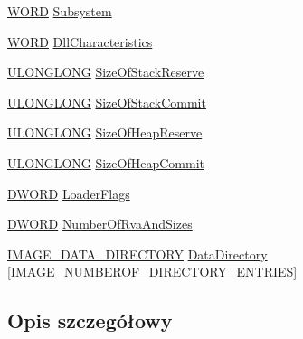 \begin{DoxyCompactItemize}
\item 
\hyperlink{winheader_8h_ab24077addd3b7b13e086987ff296552c}{W\-O\-R\-D} \hyperlink{struct___i_m_a_g_e___o_p_t_i_o_n_a_l___h_e_a_d_e_r64_afedeb8911d64e97bafd352f4c97e2557}{Subsystem}
\item 
\hyperlink{winheader_8h_ab24077addd3b7b13e086987ff296552c}{W\-O\-R\-D} \hyperlink{struct___i_m_a_g_e___o_p_t_i_o_n_a_l___h_e_a_d_e_r64_acb52816f699486ae920bb8537108e81d}{Dll\-Characteristics}
\item 
\hyperlink{winheader_8h_ae854efed5cfd3aad7d516ab4e2ce5748}{U\-L\-O\-N\-G\-L\-O\-N\-G} \hyperlink{struct___i_m_a_g_e___o_p_t_i_o_n_a_l___h_e_a_d_e_r64_a6a430bc6cc1ff57190ebccb15fcd6c70}{Size\-Of\-Stack\-Reserve}
\item 
\hyperlink{winheader_8h_ae854efed5cfd3aad7d516ab4e2ce5748}{U\-L\-O\-N\-G\-L\-O\-N\-G} \hyperlink{struct___i_m_a_g_e___o_p_t_i_o_n_a_l___h_e_a_d_e_r64_ac80afcdeb0fc60d456350dced4e43b8a}{Size\-Of\-Stack\-Commit}
\item 
\hyperlink{winheader_8h_ae854efed5cfd3aad7d516ab4e2ce5748}{U\-L\-O\-N\-G\-L\-O\-N\-G} \hyperlink{struct___i_m_a_g_e___o_p_t_i_o_n_a_l___h_e_a_d_e_r64_ad225b09c6adc28538ee637885a9b4589}{Size\-Of\-Heap\-Reserve}
\item 
\hyperlink{winheader_8h_ae854efed5cfd3aad7d516ab4e2ce5748}{U\-L\-O\-N\-G\-L\-O\-N\-G} \hyperlink{struct___i_m_a_g_e___o_p_t_i_o_n_a_l___h_e_a_d_e_r64_a6b958f37e1630fa76f26dc60f003e7d8}{Size\-Of\-Heap\-Commit}
\item 
\hyperlink{winheader_8h_af483253b2143078cede883fc3c111ad2}{D\-W\-O\-R\-D} \hyperlink{struct___i_m_a_g_e___o_p_t_i_o_n_a_l___h_e_a_d_e_r64_a731102c663ae88402d8aa08359c44ab5}{Loader\-Flags}
\item 
\hyperlink{winheader_8h_af483253b2143078cede883fc3c111ad2}{D\-W\-O\-R\-D} \hyperlink{struct___i_m_a_g_e___o_p_t_i_o_n_a_l___h_e_a_d_e_r64_a8f05696ef5a2588164d4e502519d30b4}{Number\-Of\-Rva\-And\-Sizes}
\item 
\hyperlink{winheader_8h_a0b3ef87140356b8cb58f4af9eed4d607}{I\-M\-A\-G\-E\-\_\-\-D\-A\-T\-A\-\_\-\-D\-I\-R\-E\-C\-T\-O\-R\-Y} \hyperlink{struct___i_m_a_g_e___o_p_t_i_o_n_a_l___h_e_a_d_e_r64_a1da47d1e624bf0180d0e1363480616ff}{Data\-Directory} \mbox{[}\hyperlink{winheader_8h_a75892b738729f0de64146086f462defe}{I\-M\-A\-G\-E\-\_\-\-N\-U\-M\-B\-E\-R\-O\-F\-\_\-\-D\-I\-R\-E\-C\-T\-O\-R\-Y\-\_\-\-E\-N\-T\-R\-I\-E\-S}\mbox{]}
\end{DoxyCompactItemize}


\subsection{Opis szczegółowy}


